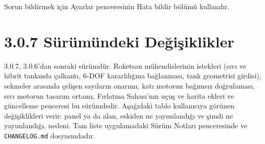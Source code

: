 \documentclass[11pt,a4paper]{article}
\newcommand{\ui}[1]{\textsf{#1}}
\newcommand{\kod}[1]{\texttt{#1}}
\begin{document}
Sorun bildirmek için \ui{Ayarlar} penceresinin \ui{Hata bildir} bölümü
kullanılır.

\section{3.0.7 Sürümündeki Değişiklikler}\label{sec:v307}

3.0.7, 3.0.6'dan sonraki sürümdür. Roketsan mühendislerinin istekleri (sıvı ve
hibrit tankında çalkantı, 6-DOF kararlılığına bağlanması, tank geometrisi
girdisi), sekmeler arasında çelişen sayıların onarımı, katı motorun bağımsız
doğrulaması, sıvı motorun tasarım ortamı, Fırlatma Sahası'nın uçuş ve harita
ekleri ve güncelleme penceresi bu sürümdedir. Aşağıdaki tablo kullanıcıya
görünen değişiklikleri verir: panel ya da alan, eskiden ne yayımlandığı ve
şimdi ne yayımlandığı, nedeni. Tam liste uygulamadaki \ui{Sürüm Notları}
penceresinde ve \kod{CHANGELOG.md} dosyasındadır.
\end{document}
